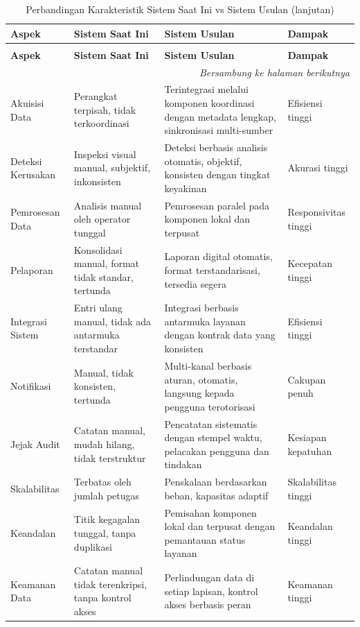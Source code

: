 {\renewcommand{\arraystretch}{1.2}
\small
\begin{longtable}{p{} p{} p{} p{}}
  \caption{Perbandingan Karakteristik Sistem Saat Ini vs Sistem Usulan}
  \label{tbl:comparison_characteristics} \\
  \toprule
  \textbf{Aspek} & \textbf{Sistem Saat Ini} & \textbf{Sistem Usulan} & \textbf{Dampak} \\
  \midrule
  \endfirsthead

  \caption*{Perbandingan Karakteristik Sistem Saat Ini vs Sistem Usulan (lanjutan)} \\
  \toprule
  \textbf{Aspek} & \textbf{Sistem Saat Ini} & \textbf{Sistem Usulan} & \textbf{Dampak} \\
  \midrule
  \endhead

  \midrule
  \multicolumn{4}{r}{\textit{Bersambung ke halaman berikutnya}} \\
  \endfoot

  \bottomrule
  \endlastfoot

  Akuisisi Data & Perangkat terpisah, tidak terkoordinasi & Terintegrasi melalui komponen koordinasi dengan metadata lengkap, sinkronisasi multi-sumber & Efisiensi tinggi \\
  Deteksi Kerusakan & Inspeksi visual manual, subjektif, inkonsisten & Deteksi berbasis analisis otomatis, objektif, konsisten dengan tingkat keyakinan & Akurasi tinggi \\
  Pemrosesan Data & Analisis manual oleh operator tunggal & Pemrosesan paralel pada komponen lokal dan terpusat & Responsivitas tinggi \\
  Pelaporan & Konsolidasi manual, format tidak standar, tertunda & Laporan digital otomatis, format terstandarisasi, tersedia segera & Kecepatan tinggi \\
  Integrasi Sistem & Entri ulang manual, tidak ada antarmuka terstandar & Integrasi berbasis antarmuka layanan dengan kontrak data yang konsisten & Efisiensi tinggi \\
  Notifikasi & Manual, tidak konsisten, tertunda & Multi-kanal berbasis aturan, otomatis, langsung kepada pengguna terotorisasi & Cakupan penuh \\
  Jejak Audit & Catatan manual, mudah hilang, tidak terstruktur & Pencatatan sistematis dengan stempel waktu, pelacakan pengguna dan tindakan & Kesiapan kepatuhan \\
  Skalabilitas & Terbatas oleh jumlah petugas & Penskalaan berdasarkan beban, kapasitas adaptif & Skalabilitas tinggi \\
  Keandalan & Titik kegagalan tunggal, tanpa duplikasi & Pemisahan komponen lokal dan terpusat dengan pemantauan status layanan & Keandalan tinggi \\
  Keamanan Data & Catatan manual tidak terenkripsi, tanpa kontrol akses & Perlindungan data di setiap lapisan, kontrol akses berbasis peran & Keamanan tinggi \\
\end{longtable}
}

